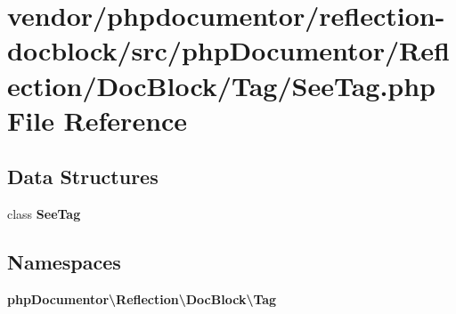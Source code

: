 \section{vendor/phpdocumentor/reflection-\/docblock/src/php\+Documentor/\+Reflection/\+Doc\+Block/\+Tag/\+See\+Tag.php File Reference}
\label{_see_tag_8php}
\subsection*{Data Structures}
\begin{DoxyCompactItemize}
\item 
class {\bf See\+Tag}
\end{DoxyCompactItemize}
\subsection*{Namespaces}
\begin{DoxyCompactItemize}
\item 
 {\bf php\+Documentor\textbackslash{}\+Reflection\textbackslash{}\+Doc\+Block\textbackslash{}\+Tag}
\end{DoxyCompactItemize}
